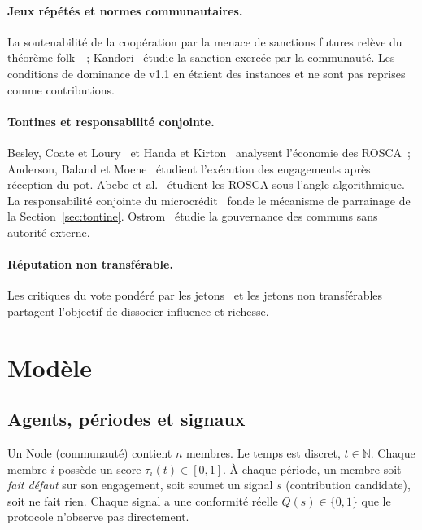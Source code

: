 \documentclass[11pt,a4paper]{article}
\theoremstyle{plain}
\theoremstyle{definition}
\theoremstyle{remark}
\newcommand{\1}{\mathbf{1}}
\begin{document}
\paragraph{Jeux répétés et normes communautaires.} La soutenabilité de la
coopération par la menace de sanctions futures relève du théorème
folk~\cite{fudenberg1986}~; Kandori~\cite{kandori1992} étudie la sanction exercée
par la communauté. Les conditions de \og{}dominance\fg{} de v1.1 en étaient des
instances et ne sont pas reprises comme contributions.

\paragraph{Tontines et responsabilité conjointe.} Besley, Coate et
Loury~\cite{besley1993} et Handa et Kirton~\cite{handa1999} analysent l'économie
des ROSCA~; Anderson, Baland et Moene~\cite{anderson2009} étudient l'exécution
des engagements après réception du pot. Abebe et al.~\cite{abebe2022} étudient
les ROSCA sous l'angle algorithmique. La responsabilité conjointe du
microcrédit~\cite{besley1995,ghatak1999} fonde le mécanisme de parrainage de la
Section~\ref{sec:tontine}. Ostrom~\cite{ostrom1990} étudie la gouvernance des
communs sans autorité externe.

\paragraph{Réputation non transférable.} Les critiques du vote pondéré par les
jetons~\cite{buterin2021} et les jetons non transférables~\cite{weyl2022}
partagent l'objectif de dissocier influence et richesse.

\section{Modèle}
\label{sec:modele}

\subsection{Agents, périodes et signaux}

Un Node (communauté) contient $n$ membres. Le temps est discret, $t\in\mathbb{N}$.
Chaque membre $i$ possède un score $\tau_i(t)\in[0,1]$. À chaque période, un
membre soit \emph{fait défaut} sur son engagement, soit soumet un signal $s$
(contribution candidate), soit ne fait rien. Chaque signal a une conformité
réelle $Q(s)\in\{0,1\}$ que le protocole n'observe pas directement.
\end{document}

